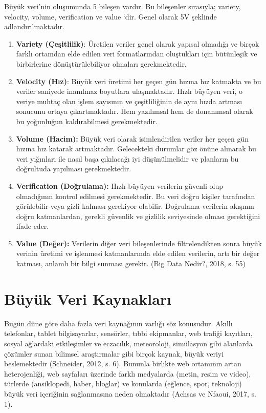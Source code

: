 \documentclass[12pt,twoside]{deuthesis}
\begin{document}
Büyük veri'nin oluşumunda 5 bileşen vardır. Bu bileşenler sırasıyla; variety, velocity, volume, verification ve value `dir. Genel olarak 5V şeklinde adlandırılmaktadır.
\begin{enumerate}
\def\labelenumi{\arabic{enumi}.}
\item
  \textbf{Variety (Çeşitlilik)}: Üretilen veriler genel olarak yapısal olmadığı ve birçok farklı ortamdan elde edilen veri formatlarından oluştukları için bütünleşik ve birbirlerine dönüştürülebiliyor olmaları gerekmektedir.
\item
  \textbf{Velocity (Hız)}: Büyük veri üretimi her geçen gün hızına hız katmakta ve bu veriler saniyede inanılmaz boyutlara ulaşmaktadır. Hızlı büyüyen veri, o veriye muhtaç olan işlem sayısının ve çeşitliliğinin de aynı hızda artması sonucunu ortaya çıkartmaktadır. Hem yazılımsal hem de donanımsal olarak bu yoğunluğun kaldırabilmesi gerekmektedir.
\item
  \textbf{Volume (Hacim): } Büyük veri olarak isimlendirilen veriler her geçen gün hızına hız katarak artmaktadır. Gelecekteki durumlar göz önüne alınarak bu veri yığınları ile nasıl başa çıkılacağı iyi düşünülmelidir ve planların bu doğrultuda yapılması gerekmektedir.
\item
  \textbf{Verification (Doğrulama):} Hızlı büyüyen verilerin güvenli olup olmadığının kontrol edilmesi gerekmektedir. Bu veri doğru kişiler tarafından görülebilir veya gizli kalması gerekiyor olabilir. Doğrulama verilerin akışının doğru katmanlardan, gerekli güvenlik ve gizlilik seviyesinde olması gerektiğini ifade eder.
\item
  \textbf{Value (Değer):} Verilerin diğer veri bileşenlerinde filtrelendikten sonra büyük verinin üretimi ve işlenmesi katmanlarında elde edilen verilerin, artı bir değer katması, anlamlı bir bilgi sunması gerekir. (Big Data Nedir?, 2018, s. 55)
\end{enumerate}
\hypertarget{buxfcyuxfck-veri-kaynaklarux131}{%
\section{Büyük Veri Kaynakları}\label{buxfcyuxfck-veri-kaynaklarux131}}

Bugün düne göre daha fazla veri kaynağının varlığı söz konusudur. Akıllı telefonlar, tablet bilgisayarlar, sensörler, tıbbi ekipmanlar, web trafiği kayıtları, sosyal ağlardaki etkileşimler ve eczacılık, meteoroloji, simülasyon gibi alanlarda çözümler sunan bilimsel araştırmalar gibi birçok kaynak, büyük veriyi beslemektedir (Schneider, 2012, s. 6). Bununla birlikte web ortamının artan heterojenliği, web sayfaları üzerinde farklı medyalarda (metin, resim ve video), türlerde (ansiklopedi, haber, bloglar) ve konularda (eğlence, spor, teknoloji) büyük veri içeriğinin sağlanmasına neden olmaktadır (Achsas ve Nfaoui, 2017, s. 1).
\end{document}
